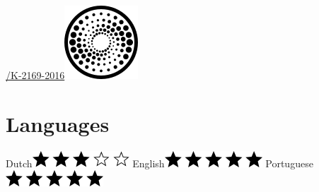 \documentclass[print]{styles/friggeri-cv-mac} %
\begin{document}
\begin{aside}
\href{http://www.researcherid.com/rid/K-2169-2016}{/K-2169-2016}\includegraphics[scale=0.3]{img/researchid.png}
~
\section{Languages}
Dutch\includegraphics[scale=0.40]{img/3stars.png}
English\includegraphics[scale=0.40]{img/5stars.png}
Portuguese\includegraphics[scale=0.40]{img/5stars.png}
\end{aside}
\end{document}
